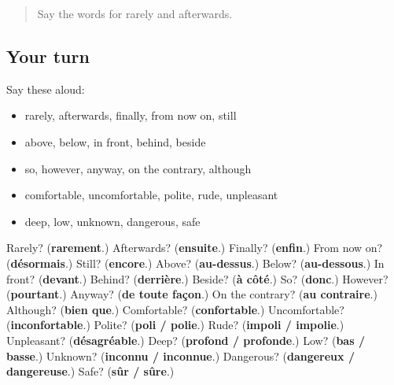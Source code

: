 \label{lesson:FR-R160-second-pass-words-from-chapters-156-160}



\begin{quote}
Say the words for rarely and afterwards.
\end{quote}

\subsection*{Your turn}
Say these aloud:

\begin{itemize}
\raggedright
  \item rarely, afterwards, finally, from now on, still
  \item above, below, in front, behind, beside
  \item so, however, anyway, on the contrary, although
  \item comfortable, uncomfortable, polite, rude, unpleasant
  \item deep, low, unknown, dangerous, safe
\end{itemize}

\begin{tcolorbox}[breakable,colback=teal!4,colframe=teal!35!black,title={Before you move on}]
Rarely? (\textbf{rarement}.) Afterwards? (\textbf{ensuite}.) Finally? (\textbf{enfin}.) From now on? (\textbf{désormais}.) Still? (\textbf{encore}.) Above? (\textbf{au-dessus}.) Below? (\textbf{au-dessous}.) In front? (\textbf{devant}.) Behind? (\textbf{derrière}.) Beside? (\textbf{à côté}.) So? (\textbf{donc}.) However? (\textbf{pourtant}.) Anyway? (\textbf{de toute façon}.) On the contrary? (\textbf{au contraire}.) Although? (\textbf{bien que}.) Comfortable? (\textbf{confortable}.) Uncomfortable? (\textbf{inconfortable}.) Polite? (\textbf{poli / polie}.) Rude? (\textbf{impoli / impolie}.) Unpleasant? (\textbf{désagréable}.) Deep? (\textbf{profond / profonde}.) Low? (\textbf{bas / basse}.) Unknown? (\textbf{inconnu / inconnue}.) Dangerous? (\textbf{dangereux / dangereuse}.) Safe? (\textbf{sûr / sûre}.)
\end{tcolorbox}
